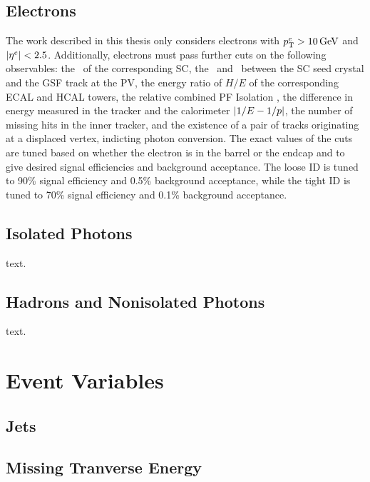 \subsection{Electrons}
\label{sec:pf_electrons}

The work described in this thesis only considers electrons with $p_{\mathrm{T}}^{{e}} > 10\,\text{Ge\hspace{-.08em}V}$ and $\lvert \eta^{{e}} \rvert < 2.5$.
Additionally, electrons must pass further cuts on the following observables:
the \sieie\ of the corresponding SC,
the \deta\ and \dphi\ between the SC seed crystal and the GSF track at the PV,
the energy  ratio of $H/E$ of the corresponding ECAL and HCAL towers,
the relative combined PF Isolation \IPF,
the difference in energy measured in the tracker and the calorimeter $\lvert 1/E - 1/p \rvert$,
the number of missing hits in the inner tracker,
and the existence of a pair of tracks originating at a displaced vertex, indicting photon conversion.
The exact values of the cuts are tuned based on whether the electron is in the barrel or the endcap and to give desired signal efficiencies and background acceptance.
The loose ID is tuned to 90\% signal efficiency and 0.5\% background acceptance, while the tight ID is tuned to 70\% signal efficiency and 0.1\% background acceptance.

\subsection{Isolated Photons}
\label{sec:pf_photons}

text.

\subsection{Hadrons and Nonisolated Photons}
\label{sec:pf_hadrons}

text.

\section{Event Variables}
\label{sec:pf_event}

\subsection{Jets}
\label{sec:pf_jets}

\subsection{Missing Tranverse Energy}
\label{sec:pf_met}

